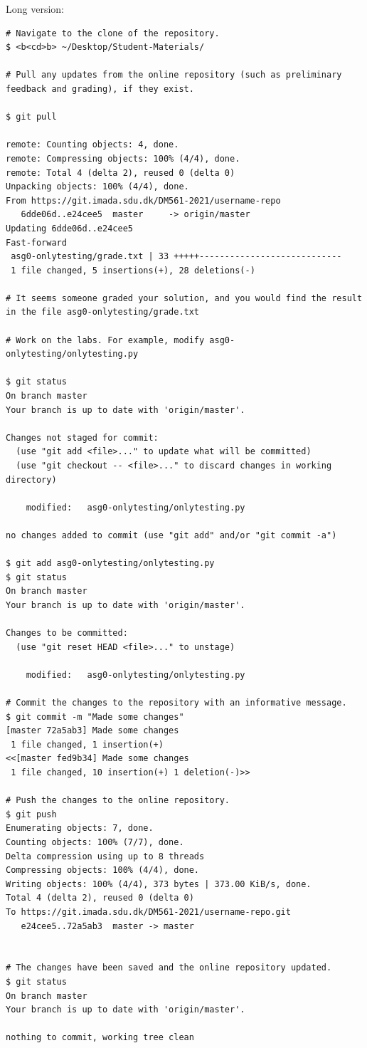 Long version:
\begin{lstlisting}
# Navigate to the clone of the repository.
$ <b<cd>b> ~/Desktop/Student-Materials/

# Pull any updates from the online repository (such as preliminary feedback and grading), if they exist.

$ git pull

remote: Counting objects: 4, done.
remote: Compressing objects: 100% (4/4), done.
remote: Total 4 (delta 2), reused 0 (delta 0)
Unpacking objects: 100% (4/4), done.
From https://git.imada.sdu.dk/DM561-2021/username-repo
   6dde06d..e24cee5  master     -> origin/master
Updating 6dde06d..e24cee5
Fast-forward
 asg0-onlytesting/grade.txt | 33 +++++----------------------------
 1 file changed, 5 insertions(+), 28 deletions(-)

# It seems someone graded your solution, and you would find the result in the file asg0-onlytesting/grade.txt
 
# Work on the labs. For example, modify asg0-onlytesting/onlytesting.py

$ git status
On branch master
Your branch is up to date with 'origin/master'.

Changes not staged for commit:
  (use "git add <file>..." to update what will be committed)
  (use "git checkout -- <file>..." to discard changes in working directory)

	modified:   asg0-onlytesting/onlytesting.py

no changes added to commit (use "git add" and/or "git commit -a")

$ git add asg0-onlytesting/onlytesting.py
$ git status
On branch master
Your branch is up to date with 'origin/master'.

Changes to be committed:
  (use "git reset HEAD <file>..." to unstage)

	modified:   asg0-onlytesting/onlytesting.py

# Commit the changes to the repository with an informative message.
$ git commit -m "Made some changes"
[master 72a5ab3] Made some changes
 1 file changed, 1 insertion(+)
<<[master fed9b34] Made some changes
 1 file changed, 10 insertion(+) 1 deletion(-)>>

# Push the changes to the online repository.
$ git push
Enumerating objects: 7, done.
Counting objects: 100% (7/7), done.
Delta compression using up to 8 threads
Compressing objects: 100% (4/4), done.
Writing objects: 100% (4/4), 373 bytes | 373.00 KiB/s, done.
Total 4 (delta 2), reused 0 (delta 0)
To https://git.imada.sdu.dk/DM561-2021/username-repo.git
   e24cee5..72a5ab3  master -> master


# The changes have been saved and the online repository updated.
$ git status
On branch master
Your branch is up to date with 'origin/master'.

nothing to commit, working tree clean
\end{lstlisting}

